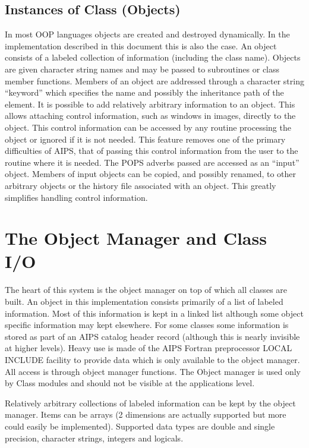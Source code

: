 \subsection{Instances of Class (Objects)}
   In most OOP languages objects are created and destroyed
dynamically.  In the implementation described in this document this is
also the case.  An object consists of a labeled collection of
information (including the class name).  Objects are given character
string names and may be passed to subroutines or class member
functions.  Members of an object are addressed through a character
string ``keyword'' which specifies the name and possibly the inheritance
path of the element.
   It is possible to add relatively arbitrary information to an
object.  This allows attaching control information, such as windows in
images, directly to the object.  This control information can be
accessed by any routine processing the object or ignored if it is not
needed.  This feature removes one of the primary difficulties of
AIPS, that of passing this control information from the user to the
routine where it is needed.  The POPS adverbs passed are accessed as
an ``input'' object.  Members of input objects can be copied, and
possibly renamed, to other arbitrary objects or the history file
associated with an object.  This greatly simplifies
handling control information.

\section{The Object Manager and Class I/O}

   The heart of this system is the object manager on top of which all
classes are built.  An object in this implementation consists
primarily of a list of labeled information.  Most of this information
is kept in a linked list although some object specific information may
kept elsewhere.  For some classes some information is stored
as part of an AIPS catalog header record (although this is nearly
invisible at higher levels).  Heavy use is made of the AIPS Fortran
preprocessor LOCAL INCLUDE facility to provide data which is only
available to the object manager.  All access is through object manager
functions.  The Object manager is used only by Class modules and
should not be visible at the applications level.

   Relatively arbitrary collections of labeled information can be kept
by the object manager.  Items can be arrays (2 dimensions are actually
supported but more could easily be implemented).  Supported data types
are double and single precision, character strings, integers and
logicals.

